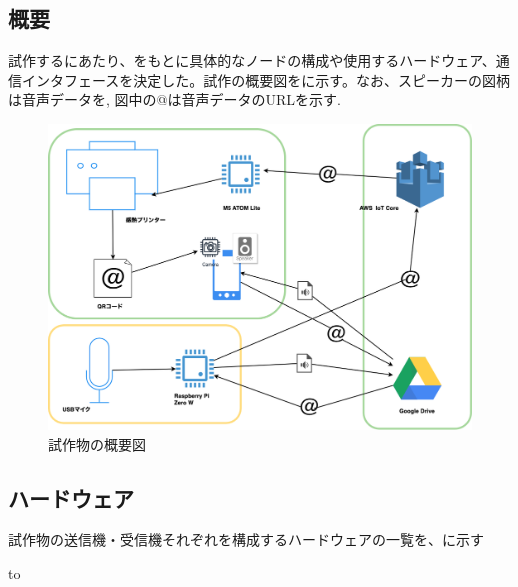 \documentclass[submit,techrep,noauthor]{ipsj}
\begin{document}
\subsection{概要}
試作するにあたり、をもとに具体的なノードの構成や使用するハードウェア、通信インタフェースを決定した。試作の概要図をに示す。なお、スピーカーの図柄は音声データを,
図中の@は音声データのURLを示す.
\begin{figure}[tb]
\includegraphics[scale=0.2,bb= 0 0 2000 1000]{image/proto_drawio.png}
\caption{試作物の概要図}
\label{fig:proto-overview}
\end{figure}

\subsection{ハードウェア}
試作物の送信機・受信機それぞれを構成するハードウェアの一覧を、に示す

\begin{table}[tb] 
\caption{試作物のハードウェア一覧} 
\label{tab:proto-hardwares}
\hbox to
\end{table}
\end{document}
